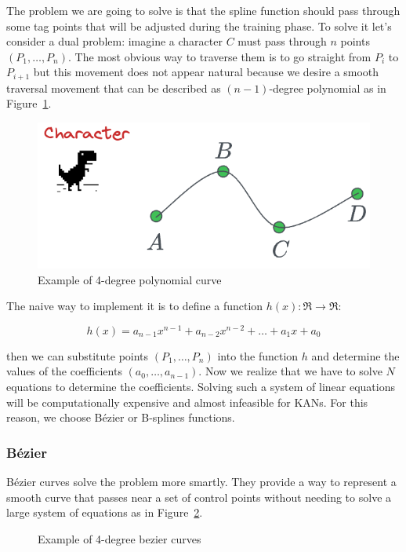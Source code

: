 \documentclass[12pt,a4paper]{article}
\begin{document}
The problem we are going to solve is that the spline function should pass through some tag points that will be adjusted during the training phase. To solve it let's consider a dual problem: imagine a character $C$ must pass through $n$ points $(P_1, \dots,P_n)$. The most obvious way to traverse them is to go straight from $P_i$ to $P_{i+1}$ but this movement does not appear natural because we desire a smooth traversal movement that can be described as $(n-1)$-degree polynomial as in Figure~\ref{fig:bezier}.  
\begin{figure}[H]
    \centering
    \includegraphics[width=0.5\linewidth]{Images/bezier.png}
    \caption{Example of 4-degree polynomial curve}
    \label{fig:bezier}
\end{figure}

The naive way to implement it is to define a function $h(x): \Re \to \Re$:

$$h(x) = a_{n-1}x^{n-1} + a_{n-2}x^{n-2} + \dots + a_1x +a_0 $$

then we can substitute points $(P_1, \dots,P_n)$ into the function $h$ and determine the values of the coefficients $(a_0, \dots,a_{n-1})$. Now we realize that we have to solve $N$ equations to determine the coefficients. Solving such a system of linear equations will be computationally expensive and almost infeasible for KANs. For this reason, we choose Bézier or B-splines functions.

\subsubsection{Bézier}
Bézier curves solve the problem more smartly. They provide a way to represent a smooth curve that passes near a set of control points without needing to solve a large system of equations as in Figure~\ref{fig:bezier2}.   
\begin{figure}[H]
    \centering
    \hfill
    \caption{Example of 4-degree bezier curves}
    \label{fig:bezier2}
\end{figure}
\end{document}
